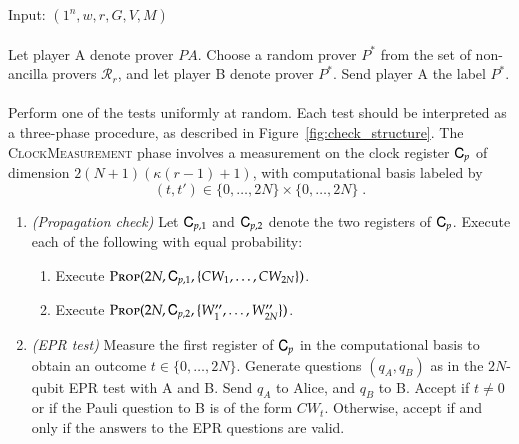 \vspace{10pt}
\begin{center}
\begin{mdframed}
    Input: $(1^n,w,r,G,V,M)$ \\
    \\
	Let player A denote prover $PA$.
    Choose a random prover $P^*$ from the set of non-ancilla provers $\mathcal{R}_r$, and let player B denote prover $P^*$. Send player A the label $P^*$. \\
    \\
    Perform one of the tests uniformly at random. Each test should be interpreted as a three-phase procedure, as described in Figure~\ref{fig:check_structure}. The \textsc{ClockMeasurement} phase involves a measurement on the clock register ${\textsf{C}}_p$ of dimension $2(N+1)(\kappa(r-1)+1)$, with computational basis labeled by 
    \[
    (t,t')\in \{0,\ldots,2N\} \times \{0,\ldots,2N\}\; .
    \]
    
	\begin{enumerate}

\item \emph{(Propagation check)} Let ${\textsf{C}}_{p,1}$ and ${\textsf{C}}_{p,2}$ denote the two registers of ${\textsf{C}}_p$. Execute each of the following with equal probability:
\begin{enumerate}
\item Execute $\textsc{Prop}(2N,{\textsf{C}}_{p,1},\{CW_1,\ldots,CW_{2N}\})$.
\item Execute $\textsc{Prop}(2N,{\textsf{C}}_{p,2},\{W''_1,\ldots,W''_{2N}\})$.
\end{enumerate}

 \item \emph{(EPR test)} Measure the first register of ${\textsf{C}}_{p}$ in the computational basis to obtain an outcome $t\in\{0,\ldots,2N\}$. 
Generate questions $(q_A,q_B)$ as in the $2N$-qubit EPR test with A and B. Send $q_A$ to Alice, and $q_B$ to B. Accept if $t\neq 0$ or if the Pauli question to B is of the form $CW_t$. Otherwise, accept if and only if the answers to the EPR questions are valid.


\end{enumerate}
\end{mdframed}
\end{center}
